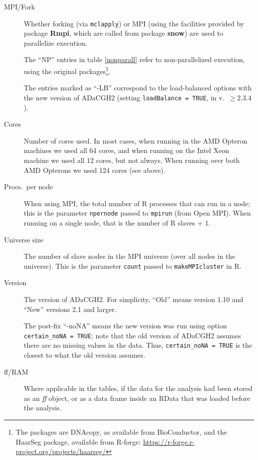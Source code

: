\documentclass[a4paper,11pt]{article}
\begin{document}
\begin{description}
  \item[MPI/Fork] Whether forking (via \texttt{mclapply}) or MPI (using
    the facilities provided by package \textbf{Rmpi}, which are called
    from package \textbf{snow}) are used to parallelize execution.

    The ``NP'' entries in table \ref{nonparall} refer to non-parallelized
    execution, using the original packages\footnote{The packages are
      DNAcopy, as available from BioConductor, and the HaarSeg package,
      available from R-forge:
      \url{https://r-forge.r-project.org/projects/haarseg/}}.

    The entries marked as ``-LB'' correspond to the load-balanced options
    with the new version of ADaCGH2 (setting \texttt{loadBalance = TRUE},
    in v.\ $\ge 2.3.4$).


\item[Cores] Number of cores used. In most cases, when running in the AMD Opteron
  machines we used all 64 cores, and when running on the Intel Xeon
  machine we used all 12 cores, but not always. When running over both AMD
  Opterons we used 124 cores (see above).

\item[Procs.\ per node] When using MPI, the total number of R processes
  that can run in a node; this is the parameter \texttt{npernode} passed
  to \texttt{mpirun} (from Open MPI). When running on a single node, that
  is the number of R slaves + 1.
\item[Universe size] The number of slave nodes in the MPI universe (over
  all nodes in the universe). This is the parameter \texttt{count} passed
  to \texttt{makeMPIcluster} in R.

\item[Version] The version of ADaCGH2. For simplicity, ``Old'' means
  version 1.10 and ``New'' versions 2.1 and larger.
  
  The post-fix ``-noNA'' means the new version was run using option
  \texttt{certain\_noNA = TRUE}; note that the old version of ADaCGH2
  assumes there are no missing values in the data. Thus,
  \texttt{certain\_noNA = TRUE} is the closest to what the old version assumes. 

\item[ff/RAM] Where applicable in the tables, if the data for the analysis
  had been stored as an \textit{ff} object, or as a data frame inside an
  RData that was loaded before the analysis.
  

\end{description}
\end{document}
